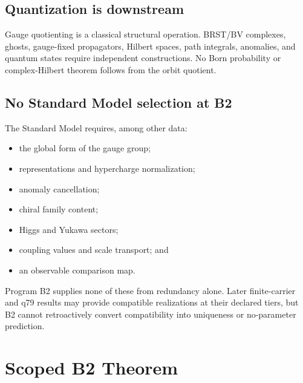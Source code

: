 \documentclass[11pt]{article}
\begin{document}
\subsection{Quantization is downstream}

Gauge quotienting is a classical structural operation.  BRST/BV complexes,
ghosts, gauge-fixed propagators, Hilbert spaces, path integrals, anomalies, and
quantum states require independent constructions.  No Born probability or
complex-Hilbert theorem follows from the orbit quotient.

\subsection{No Standard Model selection at B2}

The Standard Model requires, among other data:
\begin{itemize}
\item the global form of the gauge group;
\item representations and hypercharge normalization;
\item anomaly cancellation;
\item chiral family content;
\item Higgs and Yukawa sectors;
\item coupling values and scale transport; and
\item an observable comparison map.
\end{itemize}
Program B2 supplies none of these from redundancy alone.  Later finite-carrier
and q79 results may provide compatible realizations at their declared tiers,
but B2 cannot retroactively convert compatibility into uniqueness or
no-parameter prediction.

\section{Scoped B2 Theorem}
\end{document}
